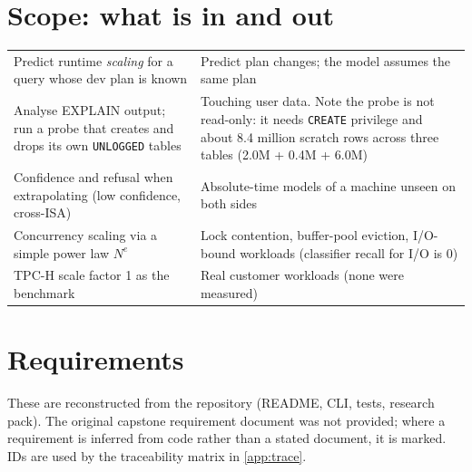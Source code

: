 \section{Scope: what is in and out}
\begin{center}\small
\begin{tabularx}{\textwidth}{@{}YY@{}}
\toprule {} & \\ \midrule
Predict runtime \emph{scaling} for a query whose dev plan is known & Predict plan changes; the model assumes the same plan\\
Analyse EXPLAIN output; run a probe that creates and drops its own \texttt{UNLOGGED} tables & Touching user data. Note the probe is not read-only: it needs \texttt{CREATE} privilege and about 8.4 million scratch rows across three tables (2.0M + 0.4M + 6.0M)\\
Confidence and refusal when extrapolating (low confidence, cross-ISA) & Absolute-time models of a machine unseen on both sides\\
Concurrency scaling via a simple power law $N^{e}$ & Lock contention, buffer-pool eviction, I/O-bound workloads (classifier recall for I/O is 0)\\
TPC-H scale factor 1 as the benchmark & Real customer workloads (none were measured)\\
\bottomrule
\end{tabularx}
\end{center}

\section{Requirements}
These are reconstructed from the repository (README, CLI, tests, research pack). The original capstone
requirement document was not provided; where a requirement is inferred from code rather than a stated
document, it is marked. IDs are used by the traceability matrix in \cref{app:trace}.

